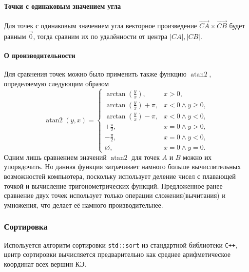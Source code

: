 \paragraph{Точки с одинаковым значением угла}
Для точек с одинаковым значением угла векторное произведение $\vec{CA}\times\vec{CB}$ будет равным $\vec{0}$, тогда сравним их по удалённости от центра $|CA|, |CB|$.

\paragraph{О производительности}
Для сравнения точек можно было применить также функцию $\operatorname{atan2}$, определяемую следующим образом
\begin{equation*}
	\operatorname{atan2}(y,x)=\begin{cases}
			\arctan(\frac{y}{x}), &x>0,\\
			\arctan(\frac{y}{x})+\pi, &x<0 \wedge y\geq 0,\\
			\arctan(\frac{y}{x})-\pi, &x<0 \wedge y<0,\\
			+\frac{\pi}{2}, &x=0 \wedge y>0,\\
			-\frac{\pi}{2}, &x=0 \wedge y<0,\\
			\varnothing, &x=0\wedge y=0.
		\end{cases}
\end{equation*}
Одним лишь сравнением значений $\operatorname{atan2}$ для точек $A$ и $B$ можно их упорядочить. Но данная функция затрачивает намного больше вычислительных возможностей компьютера, поскольку использует деление чисел с плавающей точкой и вычисление тригонометрических функций. Предложенное ранее сравнение двух точек использует только операции сложения(вычитания) и умножения, что делает её намного производительнее.

\subsubsection{Сортировка}
Испольуется алгоритм сортировки \verb|std::sort| из стандартной библиотеки \verb|C++|, центр сортировки вычисляется предварительно как среднее арифметическое координат всех вершин КЭ.

